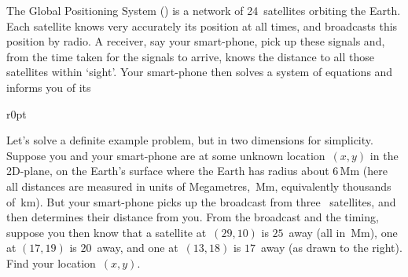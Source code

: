 \begin{example} \label{eg:gps2}
The Global Positioning System (\gps) is a network of 24~satellites orbiting the Earth.
Each satellite knows very accurately its position at all times, and broadcasts this position by radio.
A receiver, say your smart-phone, pick up these signals and, from the time taken for the signals to arrive, knows the distance to all those satellites within `sight'.
Your smart-phone then solves a system of equations and informs you of its 

\begin{wrapfigure}r{0pt}
\end{wrapfigure}
Let's solve a definite example problem, but in two dimensions for simplicity.
Suppose you and your smart-phone are at some unknown location~\((x,y)\) in the 2D-plane, on the Earth's surface where the Earth has radius about \(6\)\,Mm (here all distances are measured in units of Megametres,~Mm, equivalently thousands of~km).
But your smart-phone picks up the broadcast from three \gps\ satellites, and then determines their distance from you.
From the broadcast and the timing, suppose you then know that a satellite at~\((29,10)\) is \(25\)~away (all in~Mm), one at \((17,19)\) is \(20\)~away, and one at~\((13,18)\) is \(17\)~away (as drawn to the right).
Find your location~\((x,y)\).



\end{example}

